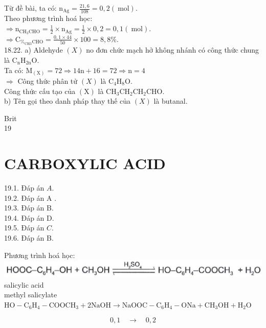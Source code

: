 \documentclass[10pt]{article}
\begin{document}
Từ đề bài, ta có: $\mathrm{n}_{\mathrm{Ag}}=\frac{21,6}{108}=0,2(\mathrm{~mol})$.\\
Theo phương trình hoá học:\\
$\Rightarrow \mathrm{n}_{\mathrm{CH}_{3} \mathrm{CHO}}=\frac{1}{2} \times \mathrm{n}_{\mathrm{Ag}}=\frac{1}{2} \times 0,2=0,1(\mathrm{~mol})$.\\
$\Rightarrow \mathrm{C}_{\%_{\mathrm{CH} 3} \mathrm{CHO}}=\frac{0,1 \times 44}{50} \times 100=8,8 \%$.\\
18.22. a) Aldehyde $(X)$ no đơn chức mạch hở không nhánh có công thức chung là $\mathrm{C}_{\mathrm{n}} \mathrm{H}_{2 \mathrm{n}} \mathrm{O}$.\\
Ta có: $\mathrm{M}_{(\mathrm{X})}=72 \Rightarrow 14 \mathrm{n}+16=72 \Rightarrow \mathrm{n}=4$\\
$\Rightarrow$ Công thức phân tử $(X)$ là $\mathrm{C}_{4} \mathrm{H}_{8} \mathrm{O}$.\\
Công thức cấu tạo của $(\mathrm{X})$ là $\mathrm{CH}_{3} \mathrm{CH}_{2} \mathrm{CH}_{2} \mathrm{CHO}$.\\
b) Tên gọi theo danh pháp thay thế của $(X)$ là butanal.

Brit\\
19

\section*{CARBOXYLIC ACID}
19.1. Đáp án $A$.\\
19.2. Đáp án A .\\
19.3. Đáp án B.\\
19.4. Đáp án D.\\
19.5. Đáp án $C$.\\
19.6. Đáp án B.

Phương trình hoá học:\\
\includegraphics[max width=\textwidth, center]{2025_10_23_adad5b98d65ac6665838g-39(2)}\\
salicylic acid\\
methyl salicylate\\
$\mathrm{HO}-\mathrm{C}_{6} \mathrm{H}_{4}-\mathrm{COOCH}_{3}+2 \mathrm{NaOH} \rightarrow \mathrm{NaOOC}-\mathrm{C}_{6} \mathrm{H}_{4}-\mathrm{ONa}+\mathrm{CH}_{3} \mathrm{OH}+\mathrm{H}_{2} \mathrm{O}$


\begin{equation*}
0,1 \quad \rightarrow \quad 0,2 \tag{mol}
\end{equation*}
\end{document}
